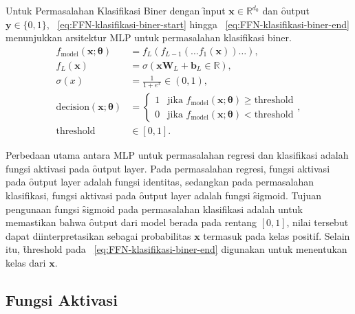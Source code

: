     Untuk Permasalahan Klasifikasi Biner dengan \f{input} $\mathbf{x}\in \mathbb{R}^{d_0}$ dan \f{output} $\mathbf{y} \in \{0, 1\}$, \equ~\ref{eq:FFN-klasifikasi-biner-start} hingga \equ~\ref{eq:FFN-klasifikasi-biner-end} menunjukkan arsitektur MLP untuk permasalahan klasifikasi biner.
    \begin{align}
        \label{eq:FFN-klasifikasi-biner-start}
        f_{\text{model}}(\mathbf{x};\bm{\theta}) &= f_L(f_{L-1}(\dots f_1(\mathbf{x})) \dots), \\
        f_L(\mathbf{x}) &= \sigma(\mathbf{x} \mathbf{W}_L + \mathbf{b}_L \in \mathbb{R}), \\
        \sigma(x) &= \frac{1}{1 + e^{x}} \in (0, 1), \\
        \text{decision}(\mathbf{x};\bm{\theta}) &= \begin{cases}
        1 & \text{jika } f_{\text{model}}(\mathbf{x};\bm{\theta}) \geq \text{threshold} \\
        0 & \text{jika } f_{\text{model}}(\mathbf{x};\bm{\theta}) < \text{threshold}
        \end{cases}, \\
        \label{eq:FFN-klasifikasi-biner-end}
        \text{threshold}&\in [0, 1].
    \end{align}

    Perbedaan utama antara MLP untuk permasalahan regresi dan klasifikasi adalah fungsi aktivasi pada \f{output layer}. Pada permasalahan regresi, fungsi aktivasi pada \f{output layer} adalah fungsi identitas, sedangkan pada permasalahan klasifikasi, fungsi aktivasi pada \f{output layer} adalah fungsi \f{sigmoid}. Tujuan pengunaan fungsi \f{sigmoid} pada permasalahan klasifikasi adalah untuk memastikan bahwa \f{output} dari model berada pada rentang $[0, 1]$, nilai tersebut dapat diinterpretasikan sebagai probabilitas $\mathbf{x}$ termasuk pada kelas positif. Selain itu, \f{threshold} pada \equ~\ref{eq:FFN-klasifikasi-biner-end} digunakan untuk menentukan kelas dari $\mathbf{x}$.

    \subsection{Fungsi Aktivasi}

